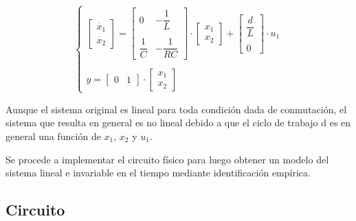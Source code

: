 \vspace{-0.5cm}
\begin{equation}
    \begin{cases}
        \begin{bmatrix}
            \dot{x_1}\\
            \dot{x_2}
        \end{bmatrix}
        =
        \begin{bmatrix}
            0  &   -\dfrac{1}{L}\\
            \\
            \dfrac{1}{C} & -\dfrac{1}{RC}
        \end{bmatrix}
        \cdot
        \begin{bmatrix}
            x_1 \\
            x_2
        \end{bmatrix}
        +
        \begin{bmatrix}
            \dfrac{d}{L} \\
            \\
            0
        \end{bmatrix}
        \cdot
        u_1 
        \\
        \\
        y =
        \begin{bmatrix}
            0 & 1
        \end{bmatrix}
        \cdot
        \begin{bmatrix}
            x_1 \\
            x_2
        \end{bmatrix}

    \end{cases}
\end{equation}

Aunque el sistema original es lineal para toda condición dada de conmutación, el sistema que resulta 
en general es no lineal debido a que el ciclo de trabajo d es en general una función de $x_1$, $x_2$ y $u_1$. \parencite{RASHID}

Se procede a implementar el circuito físico para luego obtener un modelo del sistema lineal e invariable en el tiempo mediante
identificación empírica.

\vspace{-0.5cm}
\subsection{\textbf{Circuito}}
\vspace{-0.5cm}

